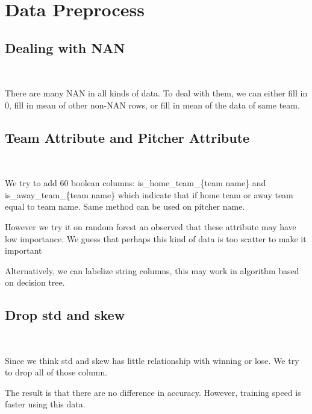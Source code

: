 \section{Data Preprocess}

\subsection*{Dealing with NAN}
\ \par There are many NAN in all kinds of data. To deal with them, we can either fill in 0, fill in mean of other non-NAN rows, or fill in mean of the data of same team.

\subsection*{Team Attribute and Pitcher Attribute}
\ \par We try to add 60 boolean columns: is\_home\_team\_\{team name\} and is\_away\_team\_\{team name\} which indicate that if home team or away team equal to team name. Same method can be used on pitcher name. 
\par However we try it on random forest an observed that these attribute may have low importance. We guess that perhaps this kind of data is too scatter to make it important
\par Alternatively, we can labelize string columns, this may work in algorithm based on decision tree.

\subsection*{Drop std and skew}
\ \par Since we think std and skew has little relationship with winning or lose. We try to drop all of those column.
\par The result is that there are no difference in accuracy. However, training speed is faster using this data.


